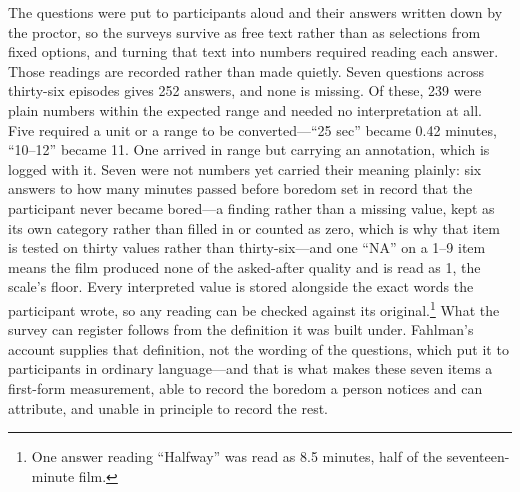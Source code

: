 The questions were put to participants aloud and their answers written down by the proctor, so
the surveys survive as free text rather than as selections from fixed options, and turning that
text into numbers required reading each answer. Those readings are recorded rather than made
quietly. Seven questions across thirty-six episodes gives 252 answers, and none is missing.
Of these, 239 were plain numbers within the expected range and needed no interpretation at
all. Five required a unit or a range to be converted---``25 sec'' became 0.42 minutes,
``10--12'' became 11. One arrived in range but carrying an annotation, which is logged with
it. Seven were not numbers yet carried their meaning plainly: six answers to how many minutes
passed before boredom set in record that the participant never became bored---a finding
rather than a missing value, kept as its own category rather than filled in or counted as
zero, which is why that item is tested on thirty values rather than thirty-six---and one
``NA'' on a 1--9 item means the film produced none of the asked-after quality and is read as
1, the scale's floor. Every
interpreted value is stored alongside the exact words the participant wrote, so any reading can
be checked against its original.\footnote{One answer reading ``Halfway'' was read as 8.5
minutes, half of the seventeen-minute film.} What the survey can register follows from the
definition it was built under. Fahlman's account supplies that definition, not the wording of
the questions, which put it to participants in ordinary language---and that is what makes these
seven items a first-form measurement, able to record the boredom a person notices and can
attribute, and unable in principle to record the rest.

